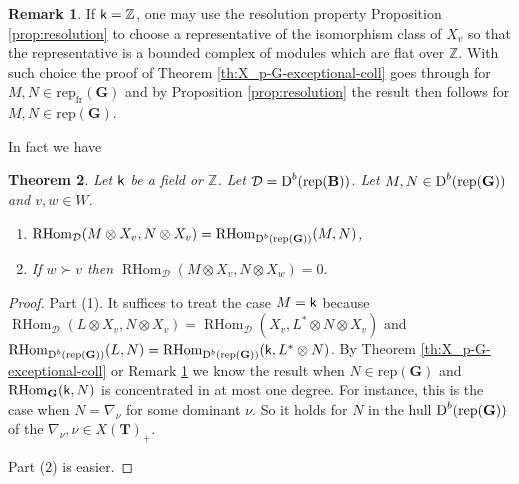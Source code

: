 \documentclass[sn-mathphys-num]{sn-jnl}%
\newcommand{\D}{\mathcal D}
\newcommand{\rep}{{\mathrm{rep}}}
\newcommand{\fr}{{\mathrm {fr}}}
\newcommand*{\Dd}{\mathop{\mathrm D\kern0pt}\nolimits}
\newcommand*{\RHom}{\mathop{\mathrm {RHom}}\nolimits}
\newcommand{\sk}{{\sf k}}
\newcommand{\Z}{{\mathbb Z}}
\newcommand{\bg}{\mathbf G}
\newcommand{\fb}{\mathbf B}
\newcommand{\bt}{\mathbf T}
\newtheorem{theorem}{Theorem}[section]
\theoremstyle{definition}
\newtheorem{remark}[theorem]{Remark}
\begin{document}
\begin{remark}\label{rem:flat representative}
If $\sk=\Z$, one may use the resolution property Proposition \ref{prop:resolution} to choose a  representative of the isomorphism class of $X_v$ so
    that the representative
    is a bounded complex of modules which are flat over $\Z$. With such choice 
     the proof of Theorem \ref{th:X_p-G-exceptional-coll} goes through for $M,N\in\rep_\fr(\bg)$ and by Proposition \ref{prop:resolution} 
    the result then follows for $M,N\in\rep(\bg)$.
\end{remark}

In fact we have
\begin{theorem}Let $\sk$ be a field or $\Z$.
\label{th:Z-X_p-G-exceptional-coll}
Let $\D=\Dd^b (\rep ({\fb}))$.
Let $M, N\in \Dd^b(\rep(\bg))$ and $v,w\in W$.
\begin{enumerate}
\item $\RHom_\D(M\otimes X_v,N\otimes X_v)=\RHom_ {\Dd^b(\rep(\bg))} (M,N) $,
\item If $w\succ  v$ then $\RHom_\D(M\otimes X_v,N\otimes X_w)=0$.
\end{enumerate}
\end{theorem}
\begin{proof}

Part (1).   It suffices to treat the case $M=\sk$
because 
$\RHom_\D(L\otimes X_v,N\otimes X_v)=\RHom_\D( X_v,L^*\otimes N\otimes X_v)$ and
$\RHom_  {\Dd^b(\rep(\bg))}  (L,N) =\RHom_  {\Dd^b(\rep(\bg))} (\sk,L^*\otimes N)$.  By Theorem \ref{th:X_p-G-exceptional-coll} or Remark
\ref{rem:flat representative} we  know the result when $N\in \rep(\bg)$ and $\RHom_ \bg (\sk,N) $ is concentrated in at most one degree. 
For instance, this is the case when $N=\nabla_\nu$ for some dominant $\nu$.
So it holds for  $N$ in the hull $\Dd^b(\rep(\bg))$ of the $\nabla_\nu,\nu\in X(\bt)_+$. 

Part (2) is easier.
\end{proof}
\end{document}

